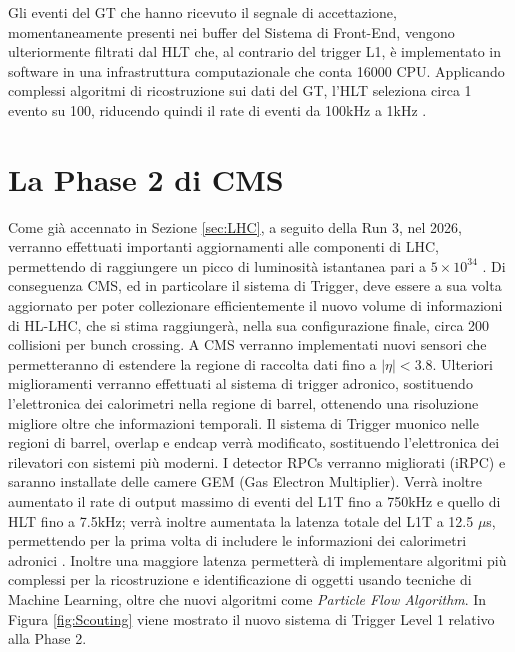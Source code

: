 Gli eventi del GT che hanno ricevuto il segnale di accettazione, momentaneamente presenti nei buffer del Sistema di Front-End, vengono ulteriormente filtrati dal HLT che, al contrario del trigger L1, è implementato in software in una infrastruttura computazionale che conta 16000 CPU. \newline
Applicando complessi algoritmi di ricostruzione sui dati del GT, l'HLT seleziona circa 1 evento su 100, riducendo quindi il rate di eventi da 100kHz a 1kHz \cite{MasterThesisNicLai}.


\section{La Phase 2 di CMS}
\label{sec:Phase2}

Come già accennato in Sezione \ref{sec:LHC}, a seguito della Run 3, nel 2026, verranno effettuati importanti aggiornamenti alle componenti di LHC, permettendo di raggiungere un picco di luminosità istantanea pari a $5 \times 10^{34}$ \Lumi. Di conseguenza CMS, ed in particolare il sistema di Trigger, deve essere a sua volta aggiornato per poter collezionare efficientemente il nuovo volume di informazioni di HL-LHC, che si stima raggiungerà, nella sua configurazione finale, circa 200 collisioni per bunch crossing. A CMS verranno implementati nuovi sensori che permetteranno di estendere la regione di raccolta dati fino a $|\eta| < 3.8$. Ulteriori miglioramenti verranno effettuati al sistema di trigger adronico, sostituendo l'elettronica dei calorimetri nella regione di barrel, ottenendo una risoluzione migliore oltre che informazioni temporali. \newline
Il sistema di Trigger muonico nelle regioni di barrel, overlap e endcap verrà modificato, sostituendo l'elettronica dei rilevatori con sistemi più moderni. I detector RPCs verranno migliorati (iRPC) e saranno installate delle camere GEM (Gas Electron Multiplier). \newline
Verrà inoltre aumentato il rate di output massimo di eventi del L1T fino a 750kHz e quello di HLT fino a 7.5kHz; verrà inoltre aumentata la latenza totale del L1T a 12.5 $\mu$s, permettendo per la prima volta di includere le informazioni dei calorimetri adronici \cite{collaboration2021phase}. Inoltre una maggiore latenza permetterà di implementare algoritmi più complessi per la ricostruzione e identificazione di oggetti usando tecniche di Machine Learning, oltre che nuovi algoritmi come \textit{Particle Flow Algorithm}. In Figura \ref{fig:Scouting} viene mostrato il nuovo sistema di Trigger Level 1 relativo alla Phase 2.

